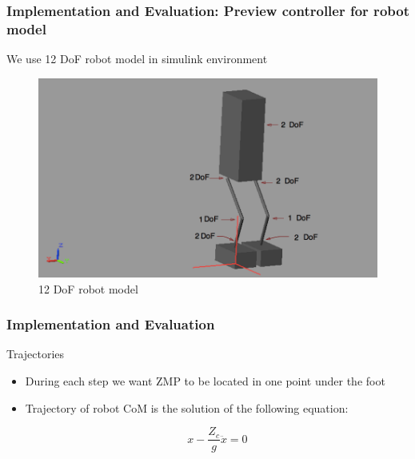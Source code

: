\documentclass{beamer}
\begin{document}

	\begin{frame}
		\frametitle{Implementation and Evaluation: Preview controller for robot model}
		We use 12 DoF robot model in simulink environment
		
		\begin{figure}[h!]
			\centering
			\includegraphics[width=0.8\linewidth]{presentation_images/25}
			\caption{12 DoF robot model}
		\end{figure}
	\end{frame}
	

	\begin{frame}
		\frametitle{Implementation and Evaluation}
		\begin{block}{Trajectories}
			\begin{itemize}
				\item
					During each step we want ZMP to be located in one point under the foot	
				\item
					Trajectory of robot CoM is the solution of the following equation:
					
					\begin{equation}
						x - \dfrac{Z_c}{g} \ddot{x} = 0
					\end{equation}
			\end{itemize}
		\end{block}
	\end{frame}
	
\end{document}

